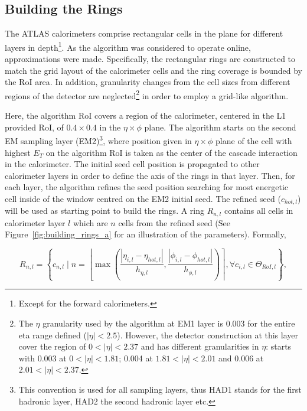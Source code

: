 \subsection{Building the Rings}\label{top:algorithm}

The ATLAS calorimeters comprise rectangular cells in the
\etaphi plane for different layers in depth\footnote{Except for the forward calorimeters.}.
As the algorithm was considered to operate online, approximations were made. Specifically, the rectangular rings are constructed to match the grid layout of the calorimeter cells and the ring coverage is bounded by the RoI area. In addition, granularity changes from the cell sizes from different regions of the detector are neglected\footnote{The $\eta$ granularity used by the algorithm at EM1 layer is 0.003 for the entire eta range defined ($|\eta|<2.5$). However, the detector construction at this layer cover the region of $0<|\eta|<2.37$ and has different granularities in $\eta$: starts with 0.003 at $0<|\eta|<1.81$; 0.004 at $1.81<|\eta|<2.01$ and 0.006 at $2.01<|\eta|<2.37$.} in order to employ a grid-like algorithm.


Here, the algorithm RoI covers a
region of the calorimeter, centered in the L1 provided RoI, of
$0.4\times0.4$ in the $\eta\times\phi$ plane. The algorithm
starts on the second EM sampling layer (EM2)\footnote{This convention is used for all sampling layers, thus HAD1 stands for the first hadronic layer, HAD2 the second hadronic layer etc.}, where position given in $\eta\times\phi$ plane of the cell with
highest $E_T$ on the algorithm RoI is taken as the center of the cascade
interaction in the calorimeter. The initial seed cell position is propagated to other calorimeter layers in order to define the axis of the rings in that layer. Then, for each layer, the algorithm refines the seed position searching for most energetic cell inside of the window centred on the EM2 initial seed. The refined seed ($c_{hot,l}$) will be used as starting point to build the rings. A ring $R_{n,l}$ contains all cells in calorimeter layer $l$ which are $n$ cells from the refined seed (See Figure~\ref{fig:building_rings_a} for an illustration of the parameters). Formally,


\begin{equation}
R_{n,l} = \left\{c_{n,l} \mid n = \left\lfloor \max{\left( 
\frac{| \eta_{i,l} - \eta_{hot,l} |}{h_{\eta,l}}, 
\frac{| \phi_{i,l} - \phi_{hot,l} |}{h_{\phi,l}} 
\right)} \right\rceil, 
\forall c_{i,l} \in
\Theta_{RoI,l}
\right\},
\end{equation}



